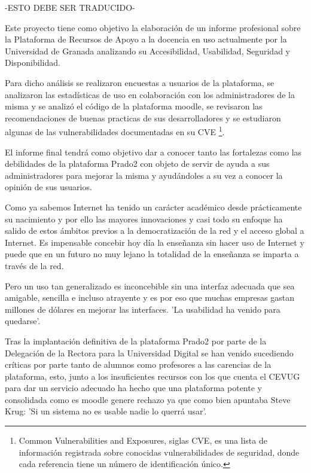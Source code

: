 {{-ESTO DEBE SER TRADUCIDO-

\bigskip
Este proyecto tiene como objetivo la elaboración de un informe profesional sobre la Plataforma de Recursos de Apoyo a la docencia en uso actualmente por la Universidad de Granada analizando su Accesibilidad, Usabilidad, Seguridad y Disponibilidad.

\bigskip
Para dicho análisis se realizaron encuestas a usuarios de la plataforma, se analizaron las estadísticas de uso en colaboración con los administradores de la misma y se analizó el código de la plataforma moodle, se revisaron las recomendaciones de buenas practicas de sus desarrolladores y se estudiaron algunas de las vulnerabilidades documentadas en su CVE \footnote{Common Vulnerabilities and Exposures, siglas CVE, es una lista de información registrada sobre conocidas vulnerabilidades de seguridad, donde cada referencia tiene un número de identificación único.}.

\bigskip
El informe final tendrá como objetivo dar a conocer tanto las fortalezas como las debilidades de la plataforma Prado2 con objeto de servir de ayuda a sus administradores para mejorar la misma y ayudándoles a su vez a conocer la opinión de sus usuarios.

\bigskip
Como ya sabemos Internet ha tenido un carácter académico desde prácticamente su nacimiento y por ello las mayores innovaciones y casi todo su enfoque ha salido de estos ámbitos previos a la democratización de la red y el acceso global a Internet. Es impensable concebir hoy día la enseñanza sin hacer uso de Internet y puede que en un futuro no muy lejano la totalidad de la enseñanza se imparta a través de la red.

\bigskip
Pero un uso tan generalizado es inconcebible sin una interfaz adecuada que sea amigable, sencilla e incluso atrayente y es por eso que muchas empresas gastan millones de dólares en mejorar las interfaces. 'La usabilidad ha venido para quedarse'.

\bigskip
Tras la implantación definitiva de la plataforma Prado2 por parte de la Delegación de la Rectora para la Universidad Digital se han venido sucediendo críticas por parte tanto de alumnos como profesores a las carencias de la plataforma, esto, junto a los insuficientes recursos con los que cuenta el CEVUG para dar un servicio adecuado ha hecho que una plataforma potente y consolidada como es moodle genere rechazo ya que como bien apuntaba Steve Krug: 'Si un sistema no es usable nadie lo querrá usar'.

}}
